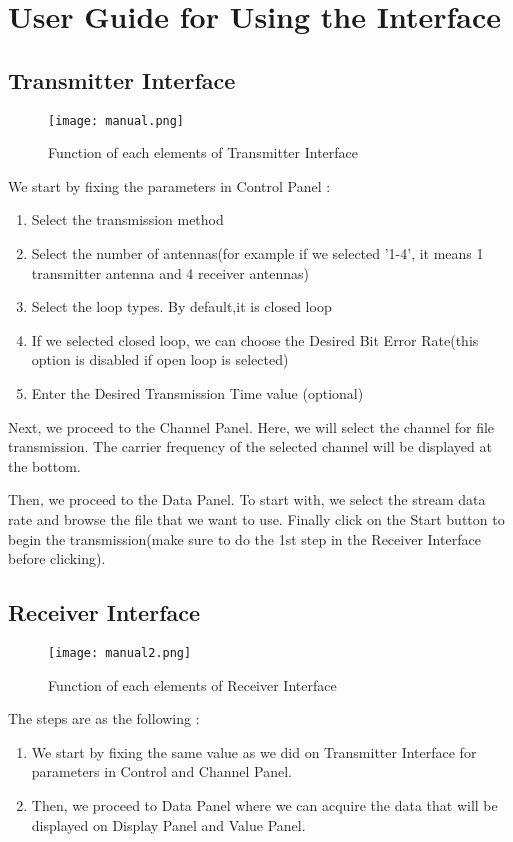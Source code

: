\section{User Guide for Using the Interface}
\subsection{Transmitter Interface}
\begin{figure}[ht]
  \centering
    \texttt{[image: manual.png]}
  \caption{Function of each elements of Transmitter Interface}
  \label{fig:manual}
\end{figure}
We start by fixing the parameters in Control Panel :
\begin{enumerate}
	\item Select the transmission method
	\item Select the number of antennas(for example if we selected '1-4', it means 1 transmitter antenna and 4 receiver antennas)
	\item Select the loop types. By default,it is closed loop
	\item If we selected closed loop, we can choose the Desired Bit Error Rate(this option is disabled if open loop is selected)
	\item Enter the Desired Transmission Time value (optional) 
\end{enumerate}
\clearpage
\par Next, we proceed to the Channel Panel. Here, we will select the channel for file transmission. The carrier frequency of the selected channel will be displayed at the bottom.

\par Then, we proceed to the Data Panel. To start with, we select the stream data rate and browse the file that we want to use. Finally click on the Start button to begin the transmission(make sure to do the 1st step in the Receiver Interface before clicking).

\subsection{Receiver Interface}

\begin{figure}[ht]
  \centering
    \texttt{[image: manual2.png]}
  \caption{Function of each elements of Receiver Interface}
  \label{fig:manual2}
\end{figure}

The steps are as the following :
\begin{enumerate}
	\item We start by fixing the same value as we did on Transmitter Interface for parameters in Control and Channel Panel. 
	\item Then, we proceed to Data Panel where we can acquire the data that will be displayed on Display Panel and Value Panel.
\end{enumerate}



 
